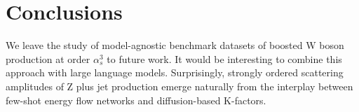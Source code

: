 \section{Conclusions}\label{sec:conclusions}

We leave the study of model-agnostic benchmark datasets of boosted W
boson production at order $\alpha_s^3$ to future work. It would be
interesting to combine this approach with large language models.
Surprisingly, strongly ordered scattering amplitudes of Z plus jet
production emerge naturally from the interplay between few-shot energy
flow networks and diffusion-based K-factors.

